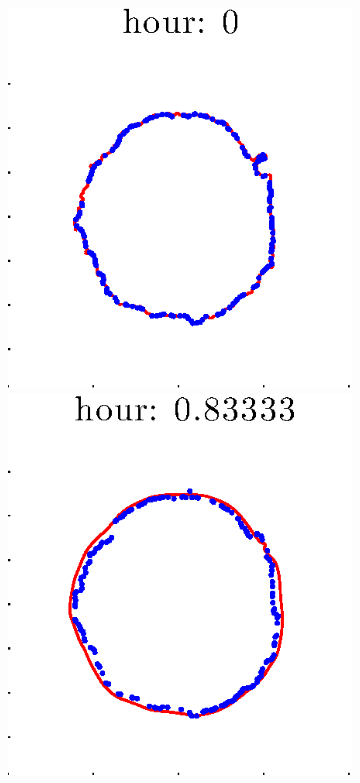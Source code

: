 \documentclass[12pt]{article}
\begin{document}
\begin{figure}[h!]
\begin{subfigure}[b]{.3\textwidth}
	\end{subfigure}
	\begin{subfigure}[b]{.3\textwidth}
	\centering
		\includegraphics[height=.15\textheight]{Pos0/secondhalf/second1.eps}
		\includegraphics[height=.15\textheight]{Pos0/secondhalf/second2.eps}

\end{subfigure}
\end{figure}
\end{document}
